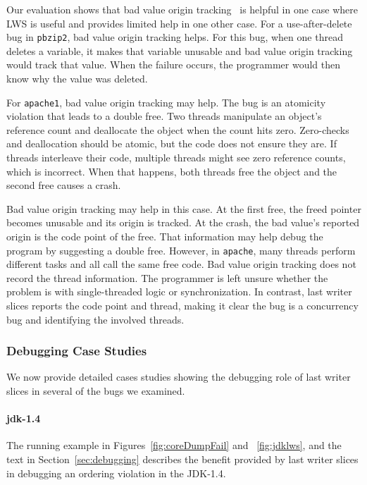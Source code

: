 \documentclass[pageno,nohyperref]{jpaper}
\newcommand{\lws}{LWS\xspace}
\begin{document}
Our evaluation shows that bad value origin tracking~\cite{badapples} is
helpful in one case where \lws is useful and provides limited help
in one other case.  For a use-after-delete bug in {\tt pbzip2}, bad value
origin tracking helps.  For this bug, when one thread deletes a variable, it
makes that variable unusable and bad value origin tracking would track that
value.  When the failure occurs, the programmer would then know why the value
was deleted.  

For {\tt apache1}, bad value origin tracking may help.  The bug is an atomicity
violation that leads to a double free.  Two threads manipulate an object's
reference count and deallocate the object when the count hits zero. Zero-checks
and deallocation should be atomic, but the code does not ensure they are.  If
threads interleave their code, multiple threads might see zero reference
counts, which is incorrect.  When that happens, both threads free the
object and the second free causes a crash.  

Bad value origin tracking may help in this case.  At the first free, the freed
pointer becomes unusable and its origin is tracked.  At the crash, the bad
value's reported origin is the code point of the free. That information may
help debug the program by suggesting a double free.  However, in {\tt apache},
many threads perform different tasks and all call the same free code.  Bad
value origin tracking does not record the thread information.  The programmer
is left unsure whether the problem is with single-threaded logic or
synchronization.  In contrast, last writer slices reports the code point and
thread, making it clear the bug is a concurrency bug and identifying the
involved threads.

\subsubsection{Debugging Case Studies}
\label{sec:eval:debugging:cases}

We now provide detailed cases studies showing the debugging role of last writer
slices in several of the bugs we examined.  



\paragraph{jdk-1.4}
The running example in Figures~\ref{fig:coreDumpFail} and ~\ref{fig:jdklws},
and the text in Section~\ref{sec:debugging} describes the benefit provided by
last writer slices in debugging an ordering violation in the JDK-1.4.
\end{document}
